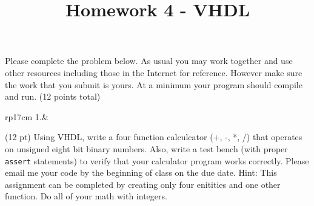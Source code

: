 \documentclass{article}
\title{Homework 4 - VHDL}
\date{}
\begin{document}
\maketitle
Please complete the problem below.  As usual you may work together and use other resources including those in the Internet for reference.  However make sure the work that you submit is yours.  At a minimum your program should compile and run. (12 points total)
\begin{longtable}[l]{rp{17cm}}
1.&\begin{minipage}[t]{\linewidth}(12 pt) Using VHDL, write a four function calculcator (+, -, *, /) that operates on unsigned eight bit binary numbers.  Also, write a test bench (with proper \texttt{assert} statements) to verify that your calculator program works correctly.  Please email me your code by the beginning of class on the due date.  Hint: This assignment can be completed by creating only four enitities and one other function.  Do all of your math with integers.

\vspace{2cm
}
\end{minipage}\\
\medskip
\end{longtable}
\end{document}
